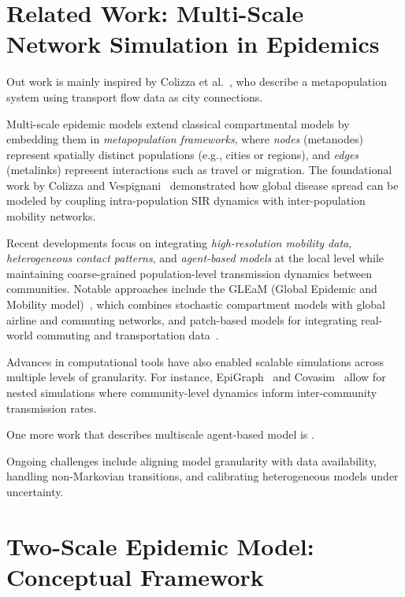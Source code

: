 \documentclass[
]{ceurart}
\begin{document}
\section{Related Work: Multi-Scale Network Simulation in Epidemics}


Out work is mainly inspired by Colizza et al.~\cite{colizza2008epidemic}, who describe a metapopulation system using transport flow data as city connections.

Multi-scale epidemic models extend classical compartmental models by embedding them in \emph{metapopulation frameworks}, where \emph{nodes} (metanodes) represent spatially distinct populations (e.g., cities or regions), and \emph{edges} (metalinks) represent interactions such as travel or migration. The foundational work by Colizza and Vespignani~\cite{colizza2008epidemic} demonstrated how global disease spread can be modeled by coupling intra-population SIR dynamics with inter-population mobility networks.

Recent developments focus on integrating \emph{high-resolution mobility data}, \emph{heterogeneous contact patterns}, and \emph{agent-based models} at the local level while maintaining coarse-grained population-level transmission dynamics between communities. Notable approaches include the GLEaM (Global Epidemic and Mobility model)~\cite{balcan2010modeling}, which combines stochastic compartment models with global airline and commuting networks, and patch-based models for integrating real-world commuting and transportation data~\cite{ajelli2010comparing}.

Advances in computational tools have also enabled scalable simulations across multiple levels of granularity. For instance, EpiGraph~\cite{hoertel2020stochastic} and Covasim~\cite{kerr2021covasim} allow for nested simulations where community-level dynamics inform inter-community transmission rates. %

One more work that describes multiscale agent-based model is \cite{kou2021multi}.

Ongoing challenges include aligning model granularity with data availability, handling non-Markovian transitions, and calibrating heterogeneous models under uncertainty.


\section{Two-Scale Epidemic Model: Conceptual Framework}
\end{document}
